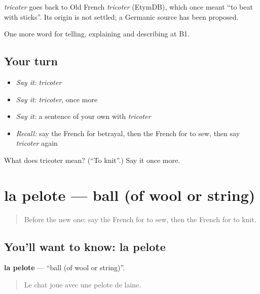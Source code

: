 \begin{cousinweb}
\emph{tricoter} goes back to Old French \emph{tricoter} (EtymDB), which once meant \textquotedblleft{}to beat with sticks\textquotedblright{}. Its origin is not settled; a Germanic source has been proposed.
\end{cousinweb}

\begin{grammarlens}[title={What you've built}]
One more word for telling, explaining and describing at B1.
\end{grammarlens}

\subsection*{Your turn}
\begin{itemize}
\raggedright
  \item \emph{Say it:} \emph{tricoter}
  \item \emph{Say it:} \emph{tricoter}, once more
  \item \emph{Say it:} a sentence of your own with \emph{tricoter}
  \item \emph{Recall:} say the French for betrayal, then the French for to sew, then say \emph{tricoter} again
\end{itemize}

\begin{tcolorbox}[breakable,colback=teal!4,colframe=teal!35!black,title={Before you move on}]
What does tricoter mean? (\textquotedblleft{}To knit\textquotedblright{}.) Say it once more.
\end{tcolorbox}
\section[la pelote]{la pelote — ball (of wool or string)}

\label{lesson:FR-C496-pelote}



\begin{quote}
Before the new one: say the French for to sew, then the French for to knit.
\end{quote}

\subsection*{You'll want to know: la pelote}
\textbf{la pelote} — \textquotedblleft{}ball (of wool or string)\textquotedblright{}.

\begin{quote}
Le chat joue avec une pelote de laine.
\end{quote}

